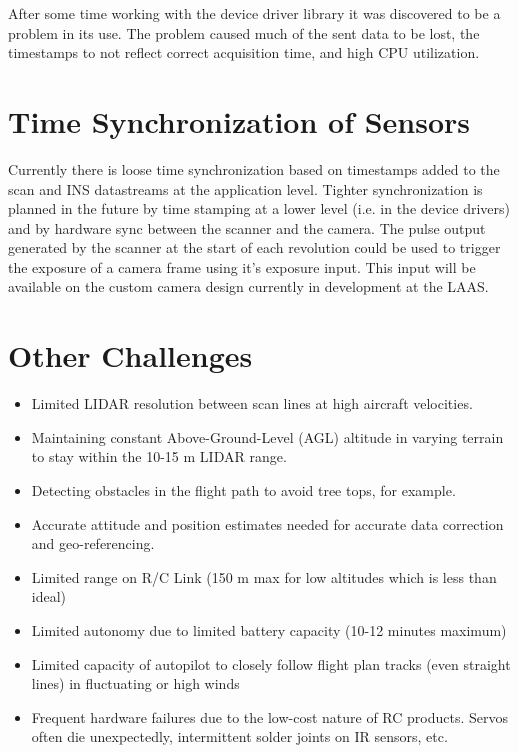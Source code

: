 \documentclass[a4paper,11pt]{report}
\begin{document}
After some time working with the device driver library it was discovered to be a problem in its use. The problem caused much of the sent data to be lost, the timestamps to not reflect correct acquisition time, and high CPU utilization. 

\section{Time Synchronization of Sensors}
 
Currently there is loose time synchronization based on timestamps added to the scan and INS datastreams at the application level. Tighter synchronization is planned in the future by time stamping at a lower level (i.e. in the device drivers) and by hardware sync between the scanner and the camera. The pulse output generated by the scanner at the start of each revolution could be used to trigger the exposure of a camera frame using it's exposure input. This input will be available on the custom camera design currently in development at the LAAS.

\section{Other Challenges}

\begin{itemize}
 \item Limited LIDAR resolution between scan lines at high aircraft velocities.
 \item Maintaining constant Above-Ground-Level (AGL) altitude in varying terrain to stay within the 10-15 m LIDAR range.
 \item Detecting obstacles in the flight path to avoid tree tops, for example.
 \item Accurate attitude and position estimates needed for accurate data correction and geo-referencing.
 \item Limited range on R/C Link (150 m max for low altitudes which is less than ideal)
 \item Limited autonomy due to limited battery capacity (10-12 minutes maximum)
 \item Limited capacity of autopilot to closely follow flight plan tracks (even straight lines) in fluctuating or high winds
 \item Frequent hardware failures due to the low-cost nature of RC products. Servos often die unexpectedly, intermittent solder joints on IR sensors, etc.
\end{itemize}
\end{document}
